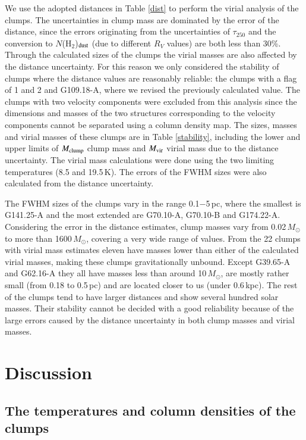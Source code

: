 \documentclass[printer]{aa}
\begin{document}
We use the adopted distances in Table \ref{dist} to perform the virial analysis of the clumps. The uncertainties in clump mass are dominated by the error of the distance, since the errors originating from the uncertainties of $\tau_{250}$ and the conversion to $N$(H$_2$)$_{\rm dust}$ (due to different $R_V$ values) are both less than 30\%. Through the calculated sizes of the clumps the virial masses are also affected by the distance uncertainty. For this reason we only considered the stability of clumps where the distance values are reasonably reliable: the clumps with a flag of 1 and 2 and G109.18-A, where we revised the previously calculated value. The clumps with two velocity components were excluded from this analysis since the dimensions and masses of the two structures corresponding to the velocity components cannot be separated using a column density map. The sizes, masses and virial masses of these clumps are in Table \ref{stability}, including the lower and upper limits of $M_{\rm clump}$ clump mass and $M_{\rm vir}$ virial mass due to the distance uncertainty. The virial mass calculations were done using the two limiting temperatures (8.5 and 19.5\,K). The errors of the FWHM sizes were also calculated from the distance uncertainty.

The FWHM sizes of the clumps vary in the range 0.1$-$5\,pc, where the smallest is G141.25-A and the most extended are G70.10-A, G70.10-B and G174.22-A. Considering the error in the distance estimates, clump masses vary from 0.02\,$M_{\odot}$ to more than 1600\,$M_{\odot}$, covering a very wide range of values. From the 22 clumps with virial mass estimates eleven have masses lower than either of the calculated virial masses, making these clumps gravitationally unbound. Except G39.65-A and G62.16-A they all have masses less than around 10\,$M_{\odot}$, are mostly rather small (from 0.18 to 0.5\,pc) and are located closer to us (under 0.6\,kpc). The rest of the clumps tend to have larger distances and show several hundred solar masses. Their stability cannot be decided with a good reliability because of the large errors caused by the distance uncertainty in both clump masses and virial masses.

\section{Discussion}
\label{discussion}

\subsection{The temperatures and column densities of the clumps}
\end{document}
